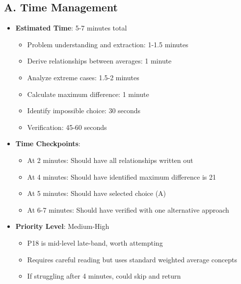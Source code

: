 \documentclass[12pt]{article}
\begin{document}
\begin{competitionbox}
\subsection*{A. Time Management}
\begin{itemize}[leftmargin=*]
    \item \textbf{Estimated Time}: 5-7 minutes total
    \begin{itemize}
        \item Problem understanding and extraction: 1-1.5 minutes
        \item Derive relationships between averages: 1 minute
        \item Analyze extreme cases: 1.5-2 minutes
        \item Calculate maximum difference: 1 minute
        \item Identify impossible choice: 30 seconds
        \item Verification: 45-60 seconds
    \end{itemize}
    \item \textbf{Time Checkpoints}: 
    \begin{itemize}
        \item At 2 minutes: Should have all relationships written out
        \item At 4 minutes: Should have identified maximum difference is 21
        \item At 5 minutes: Should have selected choice (A)
        \item At 6-7 minutes: Should have verified with one alternative approach
    \end{itemize}
    \item \textbf{Priority Level}: Medium-High
    \begin{itemize}
        \item P18 is mid-level late-band, worth attempting
        \item Requires careful reading but uses standard weighted average concepts
        \item If struggling after 4 minutes, could skip and return
    \end{itemize}
\end{itemize}


\end{competitionbox}
\end{document}
